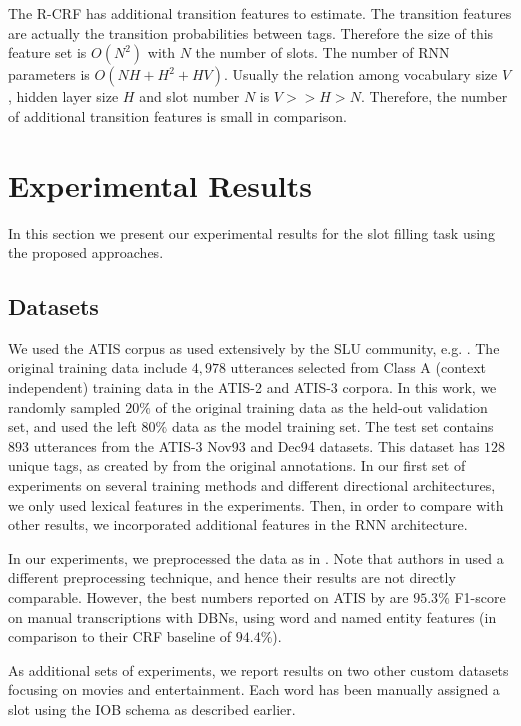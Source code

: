 The R-CRF has additional transition features to estimate. The transition
features are actually the transition probabilities between tags. Therefore the
size of this feature set is $O(N^{2})$ with $N$ the number of slots. The number of
RNN parameters is $O(NH+H^{2}+HV)$. Usually the relation among vocabulary size $V$,
hidden layer size $H$ and slot number $N$ is $V>>H>N$.  Therefore, the number of
additional transition features is small in comparison.

\section{Experimental Results}
\label{sec:exp}

In this section we present our experimental results for the slot filling task
using the proposed approaches.

\subsection{Datasets}

We used the ATIS corpus as used extensively by the SLU community, e.g.
\citep{rnn1,rnn7,rnn29,rnn38}. The original training data include $4,978$ utterances selected from
Class A (context independent) training data in the ATIS-2 and ATIS-3 corpora.
In this work, we randomly sampled $20\%$ of the original training data as the
held-out validation set, and used the left $80\%$ data as the model training set.
The test set contains $893$ utterances from the ATIS-3 Nov93 and Dec94 datasets.
This dataset has $128$ unique tags, as created by \citep{rnn34} from the original
annotations. In our first set of experiments on several training methods and
different directional architectures, we only used lexical features in the
experiments. Then, in order to compare with other results, we incorporated
additional features in the RNN architecture.

In our experiments, we preprocessed the data as in \citep{rnn24}. Note that authors in
\citep{rnn13, rnn15, rnn27, rnn29, rnn38} used a different preprocessing technique, and hence their
results are not directly comparable. However, the best numbers reported on ATIS
by \citep{rnn27} are $95.3\%$ F1-score on manual transcriptions with DBNs, using word and
named entity features (in comparison to their CRF baseline of $94.4\%$).

As additional sets of experiments, we report results on two other custom
datasets focusing on movies \citep{rnn39} and entertainment. Each word has been manually
assigned a slot using the IOB schema as described earlier.  

